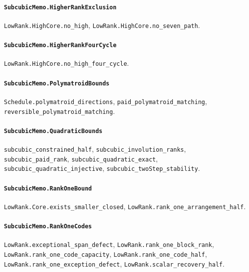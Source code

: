 \paragraph{\texttt{SubcubicMemo.HigherRankExclusion}}
{\small\raggedright \texttt{LowRank.HighCore.no\_high}, \texttt{LowRank.HighCore.no\_seven\_path}.\par}

\paragraph{\texttt{SubcubicMemo.HigherRankFourCycle}}
{\small\raggedright \texttt{LowRank.HighCore.no\_high\_four\_cycle}.\par}

\paragraph{\texttt{SubcubicMemo.PolymatroidBounds}}
{\small\raggedright \texttt{Schedule.polymatroid\_directions}, \texttt{paid\_polymatroid\_matching}, \texttt{reversible\_polymatroid\_matching}.\par}

\paragraph{\texttt{SubcubicMemo.QuadraticBounds}}
{\small\raggedright \texttt{subcubic\_constrained\_half}, \texttt{subcubic\_involution\_ranks}, \texttt{subcubic\_paid\_rank}, \texttt{subcubic\_quadratic\_exact}, \texttt{subcubic\_quadratic\_injective}, \texttt{subcubic\_twoStep\_stability}.\par}

\paragraph{\texttt{SubcubicMemo.RankOneBound}}
{\small\raggedright \texttt{LowRank.Core.exists\_smaller\_closed}, \texttt{LowRank.rank\_one\_arrangement\_half}.\par}

\paragraph{\texttt{SubcubicMemo.RankOneCodes}}
{\small\raggedright \texttt{LowRank.exceptional\_span\_defect}, \texttt{LowRank.rank\_one\_block\_rank}, \texttt{LowRank.rank\_one\_code\_capacity}, \texttt{LowRank.rank\_one\_code\_half}, \texttt{LowRank.rank\_one\_exception\_defect}, \texttt{LowRank.scalar\_recovery\_half}.\par}

